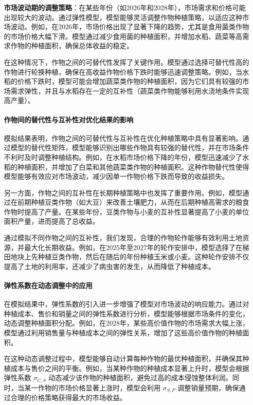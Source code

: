 \documentclass[12pt,a4paper]{nmmcm}
\begin{document}
\textbf{市场波动期的调整策略}：在某些年份（如2026年和2028年），市场需求和价格可能出现较大的波动。通过弹性模型，模型能够灵活调整作物种植策略，以适应这种市场波动。例如，在2026年，市场价格出现了显著下降的趋势，尤其是食用菌类作物的市场价格大幅下滑。模型通过减少食用菌的种植面积，并增加水稻、蔬菜等高需求作物的种植面积，确保总体收益的稳定。

在这种情况下，作物之间的可替代性发挥了关键作用。模型通过选择可替代性高的作物进行轮换种植，确保在高收益作物价格下跌时能够迅速调整策略。例如，当水稻的价格下跌时，模型可能会增加蔬菜类作物的种植面积，因为它们具有较强的市场需求弹性，并且与水稻存在一定的互补性（蔬菜类作物能够利用水浇地条件实现高产量）。

\paragraph{作物间的替代性与互补性对优化结果的影响}

模拟结果表明，作物之间的可替代性与互补性在优化种植策略中具有显著影响。通过模型的替代性矩阵，模型能够识别出哪些作物具有较强的替代性，并在市场条件不利时及时调整种植结构。例如，在水稻市场价格下降的年份，模型迅速减少了水稻的种植面积，并增加了白菜和其他蔬菜类作物的种植面积。这种作物替代性使得模型能够有效应对市场波动，减少因单一作物价格下跌而导致的收益损失。

另一方面，作物之间的互补性在长期种植策略中也发挥了重要作用。例如，模型通过在前期种植豆类作物（如大豆）来改善土壤肥力，从而在后期种植高需求的粮食作物时提高了产量。在某些年份，豆类作物与小麦的互补性显著提高了小麦的单位面积产量，进而提高了总收益。

通过模拟不同作物之间的互补性，我们发现，合理的作物轮作能够有效利用土地资源，并最大化长期收益。例如，在2025年至2027年的轮作安排中，模型选择了在梯田地块上先种植豆类作物，然后在随后的年份种植玉米或小麦。这种轮作安排不仅提高了土地的利用率，还减少了病虫害的发生，从而降低了种植成本。

\paragraph{弹性系数在动态调整中的应用}

在模拟结果中，弹性系数的引入进一步增强了模型对市场波动的响应能力。通过对种植成本、售价和销量之间的弹性系数进行分析，模型能够根据市场条件的变化，动态调整种植面积分配。例如，在2028年，某些高价值作物的市场需求大幅上涨，模型通过利用销售量与种植成本之间的弹性关系，增加了这些高价值作物的种植面积。

在这种动态调整过程中，模型能够自动计算每种作物的最优种植面积，并确保其种植成本与售价之间的平衡。例如，当某种作物的种植成本显著上升时，模型会根据弹性系数 $\sigma_{C,S}$ 动态减少该作物的种植面积，避免过高的成本侵蚀整体利润。同时，当某一作物的市场价格显著上涨时，模型会利用 $\sigma_{S,P}$ 调整销量预期，确保通过合理的价格策略获得最大的市场收益。
\end{document}
